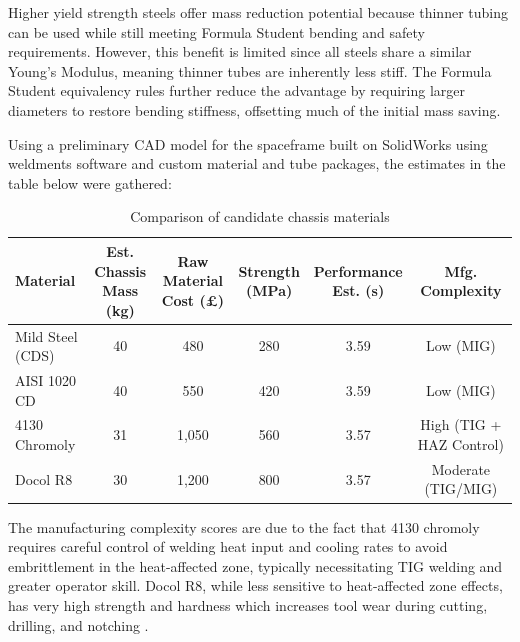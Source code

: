 Higher yield strength steels offer mass reduction potential because thinner tubing can be used while still meeting Formula Student bending and safety requirements. However, this benefit is limited since all steels share a similar Young’s Modulus, meaning thinner tubes are inherently less stiff. The Formula Student equivalency rules further reduce the advantage by requiring larger diameters to restore bending stiffness, offsetting much of the initial mass saving.

Using a preliminary CAD model for the spaceframe built on SolidWorks using weldments software and custom material and tube packages, the estimates in the table below were gathered:

\begin{table}[h]
    \centering
    \caption{Comparison of candidate chassis materials}
    \label{tab:chassis_materials}
    \footnotesize
    \begin{tabular}{|l|c|c|c|c|c|}
        \hline
        \textbf{Material} & \makecell{\textbf{Est. Chassis} \\ \textbf{Mass (kg)}} & \makecell{\textbf{Raw Material} \\ \textbf{Cost (£)}} & \makecell{\textbf{Strength} \\ \textbf{(MPa)}} & \makecell{\textbf{Performance} \\ \textbf{Est. (s)}} & \makecell{\textbf{Mfg.} \\ \textbf{Complexity}} \\
        \hline
        {Mild Steel (CDS)}\cite{rapidmetals_mild_steel_tube} & 40 & 480 & 280 & 3.59 & Low (MIG) \\
        {AISI 1020 CD}\cite{matweb_aisi1020} & 40 & 550 & 420 & 3.59 & Low (MIG) \\
        {4130 Chromoly}\cite{weldracing_25crmo4} & 31 & 1,050 & 560 & 3.57 & High (TIG + HAZ Control) \\
        {Docol R8}\cite{aedmetals_docol_r8} & 30 & 1,200 & 800 & 3.57 & Moderate (TIG/MIG) \\
        \hline
    \end{tabular}
\end{table}

The manufacturing complexity scores are due to the fact that 4130 chromoly requires careful control of welding heat input and cooling rates to avoid embrittlement in the heat-affected zone, typically necessitating TIG welding and greater operator skill. Docol R8, while less sensitive to heat-affected zone effects, has very high strength and hardness which increases tool wear during cutting, drilling, and notching \cite{millerwelds2024}.

